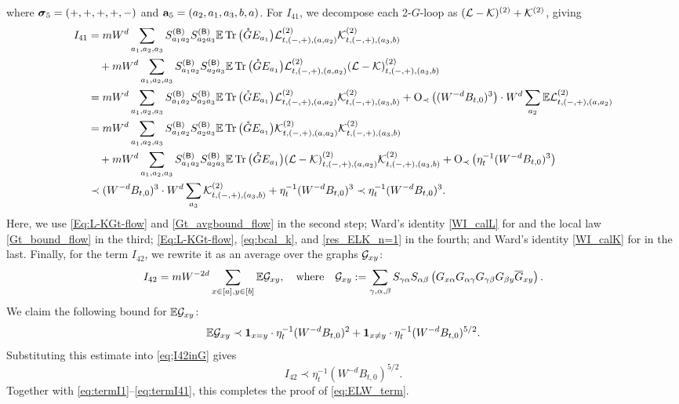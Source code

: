 where $\bsig_5=(+,+,+,+,-)$ and $\ba_5=(a_2,a_1,a_3,b,a)$. For $I_{41}$, we decompose each 2-$G$-loop as $(\cL-\cK)^{(2)}+\cK^{(2)}$, giving 
\begin{align}
    I_{41}&= mW^d\sum_{a_1, a_2,a_3}S^{(\sB)}_{a_1a_2}S^{(\sB)}_{a_2a_3} \E  \tr\big( \Gc E_{a_1} \big)  \cL^{(2)}_{t,(-,+),(a,a_2)}\cK^{(2)}_{t,(-,+),(a_3,b)} \nonumber\\
    &\quad +mW^d\sum_{a_1, a_2,a_3}S^{(\sB)}_{a_1a_2}S^{(\sB)}_{a_2a_3} \E  \tr\big( \Gc E_{a_1} \big)  \cL^{(2)}_{t,(-,+),(a,a_2)}(\cL-\cK)^{(2)}_{t,(-,+),(a_3,b)}\nonumber\\ 
    &= mW^d\sum_{a_1, a_2,a_3}S^{(\sB)}_{a_1a_2}S^{(\sB)}_{a_2a_3} \E  \tr\big( \Gc E_{a_1} \big) \cL^{(2)}_{t,(-,+),(a,a_2)}\cK^{(2)}_{t,(-,+),(a_3,b)}+ \OO_\prec\p{(W^{-d}B_{t,0})^3}\cdot W^d\sum_{ a_2}\E \cL^{(2)}_{t,(-,+),(a,a_2)} \nonumber\\
    &= mW^d\sum_{a_1, a_2,a_3}S^{(\sB)}_{a_1a_2}S^{(\sB)}_{a_2a_3} \E  \tr\big( \Gc E_{a_1} \big) \cK^{(2)}_{t,(-,+),(a,a_2)}\cK^{(2)}_{t,(-,+),(a_3,b)}\nonumber\\
    &\quad +mW^d\sum_{a_1, a_2,a_3}S^{(\sB)}_{a_1a_2}S^{(\sB)}_{a_2a_3} \E  \tr\big( \Gc E_{a_1} \big) (\cL-\cK)^{(2)}_{t,(-,+),(a,a_2)}\cK^{(2)}_{t,(-,+),(a_3,b)}+ \OO_\prec\p{\eta_t^{-1}(W^{-d}B_{t,0})^3} \nonumber\\
    &\prec (W^{-d}B_{t,0})^3\cdot W^d\sum_{a_3}\cK^{(2)}_{t,(-,+),(a_3,b)} + \eta_t^{-1}(W^{-d}B_{t,0})^3 \prec \eta_t^{-1}(W^{-d}B_{t,0})^3.\label{eq:termI41}
\end{align}
Here, we use \eqref{Eq:L-KGt-flow} and \eqref{Gt_avgbound_flow} in the second step; Ward's identity \eqref{WI_calL} for  and the local law \eqref{Gt_bound_flow} in the third; \eqref{Eq:L-KGt-flow}, \eqref{eq:bcal_k}, and \eqref{res_ELK_n=1} in the fourth; and Ward's identity \eqref{WI_calK} for  in the last. 
Finally, for the term $I_{42}$, we rewrite it as an average over the graphs $\cal G_{xy}$: 
\begin{align}\label{eq;I42inG}
 I_{42}=mW^{-2d} \sum_{x\in [a],y\in [b]} \E\cal G_{xy},\quad \text{where}\quad \cal G_{xy}:=\sum_{\gamma,\al,\beta}S_{\gamma\al}S_{\al\beta} \p{G_{x\al }G_{\al\gamma}G_{\gamma\beta}G_{\beta y}  \overline G_{xy}}.
\end{align}
We claim the following bound for $\E\cal G_{xy}$: 
\begin{align}\label{eq;EGxy:x=y}
\E\cal G_{xy} \prec \mathbf 1_{x = y}\cdot  \eta_t^{-1} (W^{-d}B_{t,0})^{2}+\mathbf 1_{x\ne y}\cdot \eta_t^{-1}(W^{-d}B_{t,0})^{5/2}. 
\end{align}
Substituting this estimate into \eqref{eq;I42inG} gives
\[ I_{42} \prec \eta_t^{-1} (W^{-d}B_{t,0})^{5/2}.\]
Together with \eqref{eq:termI1}--\eqref{eq:termI41}, this completes the proof of \eqref{eq:ELW_term}.


